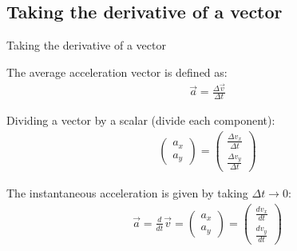 \documentclass[aspectratio=169,
hyperref={colorlinks,urlcolor=blue}
]{beamer}
\begin{document}
\subsection{Taking the derivative of a vector}
\label{subsec:takingthederivativeofavector}
\begin{bulletframe}{Taking the derivative of a vector}
\item The average acceleration vector is defined as:
\begin{align*}
\vec a = \frac{\Delta \vec v}{\Delta t}
\end{align*}
\item Dividing a vector by a scalar (divide each component):
\begin{align*}
\begin{pmatrix}
a_x\\a_y
\end{pmatrix}
= \begin{pmatrix}
\frac{\Delta v_x}{\Delta t}\\
\frac{\Delta v_y}{\Delta t}
\end{pmatrix}
\end{align*}
\item The instantaneous acceleration is given by taking $\Delta t \to 0$:
 \begin{align*}
 \vec a = \frac{d}{dt}\vec v=
\begin{pmatrix}
a_x\\a_y
\end{pmatrix}
= \begin{pmatrix}
\frac{d v_x}{dt}\\
\frac{d v_y}{dt}
\end{pmatrix}
\end{align*}
\end{bulletframe}




\end{document}
